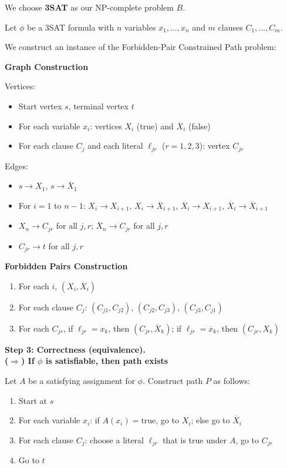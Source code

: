 We choose \textbf{3SAT} as our NP-complete problem $B$.

Let $\phi$ be a 3SAT formula with $n$ variables $x_1, \dots, x_n$ and $m$ clauses $C_1, \dots, C_m$.

We construct an instance of the Forbidden-Pair Constrained Path problem:

\textbf{Graph Construction}

Vertices:
\begin{itemize}
    \item Start vertex $s$, terminal vertex $t$
    \item For each variable $x_i$: vertices $X_i$ (true) and $\overline{X}_i$ (false)
    \item For each clause $C_j$ and each literal $\ell_{jr}$ ($r = 1,2,3$): vertex $C_{jr}$
\end{itemize}

Edges:
\begin{itemize}
    \item $s \to X_1$, $s \to \overline{X}_1$
    \item For $i = 1$ to $n-1$: $X_i \to X_{i+1}$, $X_i \to \overline{X}_{i+1}$, $\overline{X}_i \to X_{i+1}$, $\overline{X}_i \to \overline{X}_{i+1}$
    \item $X_n \to C_{jr}$ for all $j, r$; $\overline{X}_n \to C_{jr}$ for all $j, r$
    \item $C_{jr} \to t$ for all $j, r$
\end{itemize}

\textbf{Forbidden Pairs Construction}
\begin{enumerate}
    \item {} For each $i$, $(X_i, \overline{X}_i)$
    \item {} For each clause $C_j$: $(C_{j1}, C_{j2})$, $(C_{j2}, C_{j3})$, $(C_{j3}, C_{j1})$
    \item {} For each $C_{jr}$, if $\ell_{jr} = x_k$, then $(C_{jr}, \overline{X}_k)$; if $\ell_{jr} = \overline{x}_k$, then $(C_{jr}, X_k)$
\end{enumerate}

\noindent\textbf{Step 3: Correctness (equivalence).} \\

\textbf{($\Rightarrow$) If $\phi$ is satisfiable, then path exists}

Let $A$ be a satisfying assignment for $\phi$. Construct path $P$ as follows:
\begin{enumerate}
    \item Start at $s$
    \item For each variable $x_i$: if $A(x_i) = \text{true}$, go to $X_i$; else go to $\overline{X}_i$
    \item For each clause $C_j$: choose a literal $\ell_{jr}$ that is true under $A$, go to $C_{jr}$
    \item Go to $t$
\end{enumerate}

